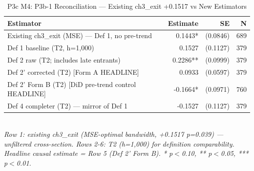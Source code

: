 \begin{table}[t]
\centering
\caption{P3c M4: P3b-1 Reconciliation — Existing ch3\_exit +0.1517 vs New Estimators}
\label{tab:ch5_reconciliation_en}
\begin{tabular}{p{6.5cm}rrr}
\toprule
Estimator & Estimate & SE & N \\
\midrule
Existing ch3_exit (MSE) — Def 1, no pre-trend & 0.1443* & (0.0846) & 689 \\
Def 1 baseline (T2, h=1,000) & 0.1527 & (0.1127) & 379 \\
Def 2 raw (T2; includes late entrants) & 0.2286** & (0.0999) & 379 \\
Def 2' corrected (T2) [Form A HEADLINE] & 0.0933 & (0.0597) & 379 \\
Def 2' Form B (T2) [DiD pre-trend control HEADLINE] & -0.1664* & (0.0971) & 760 \\
Def 4 completer (T2) — mirror of Def 1 & -0.1527 & (0.1127) & 379 \\
\bottomrule
\end{tabular}\\
\footnotesize\textit{Row 1: existing ch3\_exit (MSE-optimal bandwidth, +0.1517 p=0.039) — unfiltered cross-section. Rows 2-6: T2 (h=1,000) for definition comparability. Headline causal estimate = Row 5 (Def 2' Form B). * p$<$0.10, ** p$<$0.05, *** p$<$0.01.}
\end{table}

